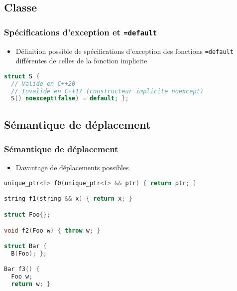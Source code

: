 \documentclass[C++.tex]{subfiles}
\begin{document}
\subsection*{Classe}
\begin{frame}[fragile]
	\frametitle{Spécifications d'exception et \lstinline|=default|}
	\begin{itemize}
		\item Définition possible de spécifications d'exception des fonctions \lstinline|=default| différentes de celles de la fonction implicite
	\end{itemize}

	\begin{lstlisting}[language=C++]
struct S {
  // Valide en C++20
  // Invalide en C++17 (constructeur implicite noexcept)
  S() noexcept(false) = default; };\end{lstlisting}
\end{frame}

\subsection*{Sémantique de déplacement}
\begin{frame}[fragile]
	\frametitle{Sémantique de déplacement}
	\begin{itemize}
		\item Davantage de déplacements possibles
	\end{itemize}

	\begin{lstlisting}[language=C++]
unique_ptr<T> f0(unique_ptr<T> && ptr) { return ptr; }

string f1(string && x) { return x; }

struct Foo{};

void f2(Foo w) { throw w; }

struct Bar {
  B(Foo); };

Bar f3() {
  Foo w;
  return w; }\end{lstlisting}

\end{frame}
\end{document}

